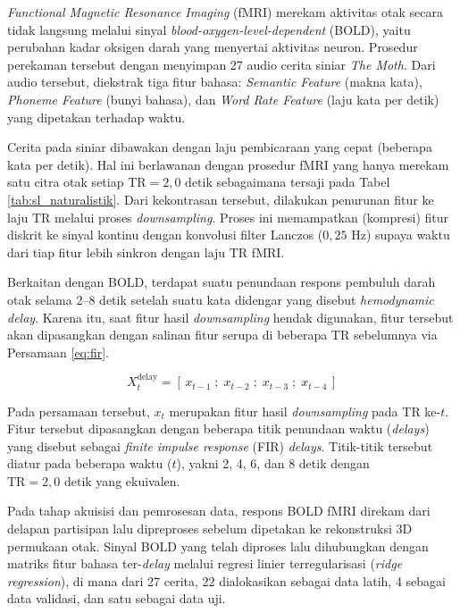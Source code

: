 \textit{Functional Magnetic Resonance Imaging} (fMRI) merekam aktivitas otak secara tidak langsung melalui sinyal \textit{blood-oxygen-level-dependent} (BOLD), yaitu perubahan kadar oksigen darah yang menyertai aktivitas neuron. Prosedur perekaman tersebut dengan menyimpan 27 audio cerita 
siniar \textit{The Moth}. Dari audio tersebut, diekstrak tiga fitur bahasa: \textit{Semantic Feature} (makna kata), \textit{Phoneme Feature} (bunyi bahasa), dan \textit{Word Rate Feature} (laju kata per detik) yang dipetakan terhadap waktu.

Cerita pada siniar dibawakan dengan laju pembicaraan yang cepat (beberapa kata per detik). Hal ini berlawanan dengan prosedur fMRI yang hanya merekam satu citra otak setiap $\text{TR} = 2{,}0\text{ detik}$ sebagaimana tersaji pada Tabel \ref{tab:sl_naturalistik}. Dari kekontrasan tersebut, dilakukan penurunan fitur ke laju $\text{TR}$ melalui proses \textit{downsampling}. Proses ini memampatkan (kompresi) fitur diskrit ke sinyal kontinu dengan konvolusi filter Lanczos ($0{,}25\text{ Hz}$) supaya waktu dari tiap fitur lebih sinkron dengan laju $\text{TR}$ fMRI.


Berkaitan dengan BOLD, terdapat suatu penundaan respons pembuluh darah otak selama 2--8 detik setelah suatu kata didengar yang disebut \textit{hemodynamic delay}. Karena itu, saat fitur hasil \textit{downsampling} hendak digunakan, fitur tersebut akan dipasangkan dengan salinan fitur serupa di beberapa TR sebelumnya via Persamaan \ref{eq:fir}.
 
\begin{equation}
  X_t^{\text{delay}} = \left[\, x_{t-1}\;;\; x_{t-2}\;;\; x_{t-3}\;;\; x_{t-4} \,\right]
  \label{eq:fir}
\end{equation}
 
Pada persamaan tersebut, $x_t$ merupakan fitur hasil \textit{downsampling} pada TR ke-$t$. Fitur tersebut dipasangkan dengan beberapa titik penundaan waktu (\textit{delays}) yang disebut sebagai \textit{finite impulse response} (FIR) \textit{delays}. Titik-titik tersebut diatur pada beberapa waktu ($t$), yakni 2, 4, 6, dan 8 detik dengan $\text{TR} = 2{,}0\text{ detik}$ yang ekuivalen. %

Pada tahap akuisisi dan pemrosesan data, respons BOLD fMRI direkam dari delapan partisipan lalu dipreproses sebelum dipetakan ke rekonstruksi 3D permukaan otak. Sinyal BOLD yang telah diproses lalu dihubungkan dengan matriks fitur bahasa ter-\textit{delay} melalui regresi linier terregularisasi (\textit{ridge regression}), di mana dari 27 cerita, 22 dialokasikan sebagai data latih, 4 sebagai data validasi, dan satu sebagai data uji. 

